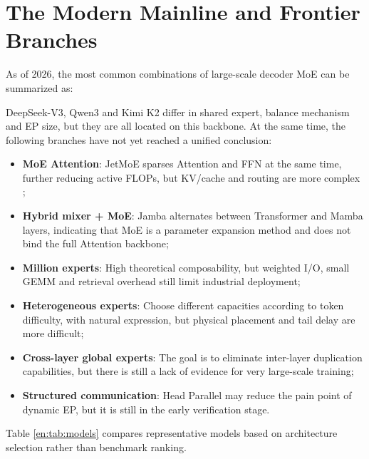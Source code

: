 \documentclass[10pt,a4paper,fontset=none]{ctexart}
\newcommand{\term}[1]{\textbf{#1}}
\begin{document}
\section{The Modern Mainline and Frontier Branches}

As of 2026, the most common combinations of large-scale decoder MoE can be summarized as:
\begin{center}
\end{center}

DeepSeek-V3, Qwen3 and Kimi K2 differ in shared expert, balance mechanism and EP size, but they are all located on this backbone. At the same time, the following branches have not yet reached a unified conclusion:
\begin{itemize}
\item \term{MoE Attention}: JetMoE sparses Attention and FFN at the same time, further reducing active FLOPs, but KV/cache and routing are more complex \cite{en:shen2024jetmoe};
\item \term{Hybrid mixer + MoE}: Jamba alternates between Transformer and Mamba layers, indicating that MoE is a parameter expansion method and does not bind the full Attention backbone\cite{en:lieber2024jamba};
\item \term{Million experts}: High theoretical composability, but weighted I/O, small GEMM and retrieval overhead still limit industrial deployment;
\item \term{Heterogeneous experts}: Choose different capacities according to token difficulty, with natural expression, but physical placement and tail delay are more difficult;
\item \term{Cross-layer global experts}: The goal is to eliminate inter-layer duplication capabilities, but there is still a lack of evidence for very large-scale training;
\item \term{Structured communication}: Head Parallel may reduce the pain point of dynamic EP, but it is still in the early verification stage.
\end{itemize}

Table \ref{en:tab:models} compares representative models based on architecture selection rather than benchmark ranking.
\end{document}
